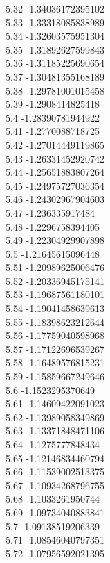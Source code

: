 {5.32	-1.34036172395102\\
5.33	-1.33318085838989\\
5.34	-1.32603575951304\\
5.35	-1.31892627599843\\
5.36	-1.31185225690654\\
5.37	-1.30481355168189\\
5.38	-1.29781001015458\\
5.39	-1.2908414825418\\
5.4	-1.28390781944922\\
5.41	-1.2770088718725\\
5.42	-1.27014449119865\\
5.43	-1.26331452920742\\
5.44	-1.25651883807264\\
5.45	-1.24975727036354\\
5.46	-1.24302967904603\\
5.47	-1.236335917484\\
5.48	-1.2296758394405\\
5.49	-1.22304929907898\\
5.5	-1.21645615096448\\
5.51	-1.20989625006476\\
5.52	-1.20336945175141\\
5.53	-1.19687561180101\\
5.54	-1.19041458639613\\
5.55	-1.18398623212644\\
5.56	-1.17759040598968\\
5.57	-1.17122696539267\\
5.58	-1.16489576815231\\
5.59	-1.15859667249646\\
5.6	-1.1523295370649\\
5.61	-1.14609422091023\\
5.62	-1.13989058349869\\
5.63	-1.13371848471106\\
5.64	-1.1275777848434\\
5.65	-1.12146834460794\\
5.66	-1.11539002513375\\
5.67	-1.10934268796755\\
5.68	-1.1033261950744\\
5.69	-1.09734040883841\\
5.7	-1.09138519206339\\
5.71	-1.08546040797351\\
5.72	-1.07956592021395\\
}
